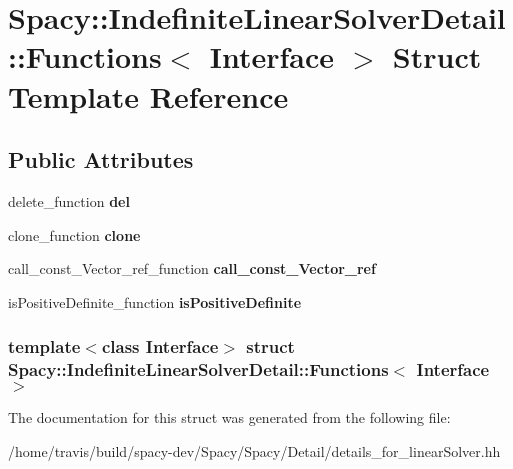 \hypertarget{structSpacy_1_1IndefiniteLinearSolverDetail_1_1Functions}{\section{\-Spacy\-:\-:\-Indefinite\-Linear\-Solver\-Detail\-:\-:\-Functions$<$ \-Interface $>$ \-Struct \-Template \-Reference}
\label{structSpacy_1_1IndefiniteLinearSolverDetail_1_1Functions}
}
\subsection*{\-Public \-Attributes}
\begin{DoxyCompactItemize}
\item 
\hypertarget{structSpacy_1_1IndefiniteLinearSolverDetail_1_1Functions_a4b45e7b74694f642327282d606157ade}{delete\-\_\-function {\bfseries del}}\label{structSpacy_1_1IndefiniteLinearSolverDetail_1_1Functions_a4b45e7b74694f642327282d606157ade}

\item 
\hypertarget{structSpacy_1_1IndefiniteLinearSolverDetail_1_1Functions_a1301bda82cf30b8809b9d5392437b6f8}{clone\-\_\-function {\bfseries clone}}\label{structSpacy_1_1IndefiniteLinearSolverDetail_1_1Functions_a1301bda82cf30b8809b9d5392437b6f8}

\item 
\hypertarget{structSpacy_1_1IndefiniteLinearSolverDetail_1_1Functions_a794520e513ff10938334a71916905146}{call\-\_\-const\-\_\-\-Vector\-\_\-ref\-\_\-function {\bfseries call\-\_\-const\-\_\-\-Vector\-\_\-ref}}\label{structSpacy_1_1IndefiniteLinearSolverDetail_1_1Functions_a794520e513ff10938334a71916905146}

\item 
\hypertarget{structSpacy_1_1IndefiniteLinearSolverDetail_1_1Functions_a3c56a552a1c307c2695b00a4822dac90}{is\-Positive\-Definite\-\_\-function {\bfseries is\-Positive\-Definite}}\label{structSpacy_1_1IndefiniteLinearSolverDetail_1_1Functions_a3c56a552a1c307c2695b00a4822dac90}

\end{DoxyCompactItemize}
\subsubsection*{template$<$class \-Interface$>$ struct Spacy\-::\-Indefinite\-Linear\-Solver\-Detail\-::\-Functions$<$ Interface $>$}



\-The documentation for this struct was generated from the following file\-:\begin{DoxyCompactItemize}
\item 
/home/travis/build/spacy-\/dev/\-Spacy/\-Spacy/\-Detail/details\-\_\-for\-\_\-linear\-Solver.\-hh\end{DoxyCompactItemize}

